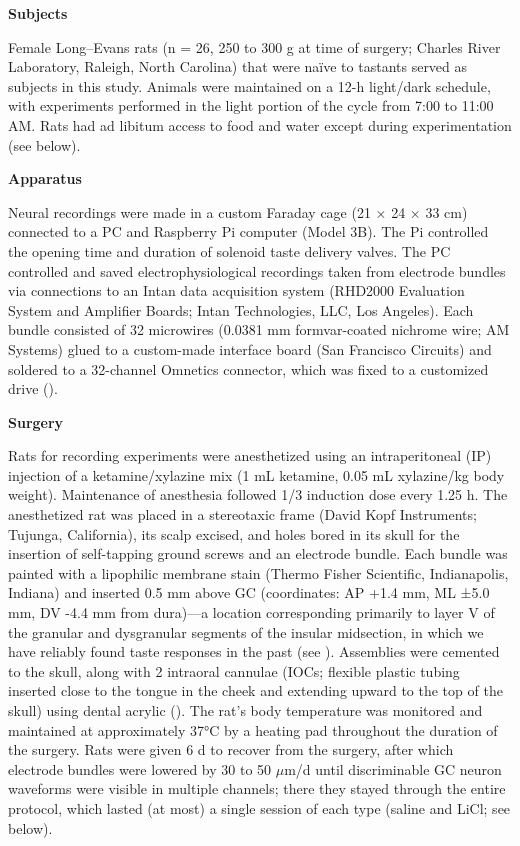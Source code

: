 \begin{refsection}
\smallskip
\noindent\textbf{Subjects}\par
\noindent 
Female Long–Evans rats (n = 26, 250 to 300 g at time of surgery; Charles River Laboratory, Raleigh, North Carolina) that were naïve to tastants served as subjects in this study. Animals were maintained on a 12-h light/dark schedule, with experiments performed in the light portion of the cycle from 7:00 to 11:00 AM. Rats had ad libitum access to food and water except during experimentation (see below).

\smallskip
\noindent\textbf{Apparatus}\par
\noindent 
Neural recordings were made in a custom Faraday cage (21 × 24 × 33 cm) connected to a PC and Raspberry Pi computer (Model 3B). The Pi controlled the opening time and duration of solenoid taste delivery valves. The PC controlled and saved electrophysiological recordings taken from electrode bundles via connections to an Intan data acquisition system (RHD2000 Evaluation System and Amplifier Boards; Intan Technologies, LLC, Los Angeles). Each bundle consisted of 32 microwires (0.0381 mm formvar-coated nichrome wire; AM Systems) glued to a custom-made interface board (San Francisco Circuits) and soldered to a 32-channel Omnetics connector, which was fixed to a customized drive (\cite{mukherjee2017a}).

\smallskip
\noindent\textbf{Surgery}\par
\noindent 
Rats for recording experiments were anesthetized using an intraperitoneal (IP) injection of a ketamine/xylazine mix (1 mL ketamine, 0.05 mL xylazine/kg body weight). Maintenance of anesthesia followed 1/3 induction dose every 1.25 h. The anesthetized rat was placed in a stereotaxic frame (David Kopf Instruments; Tujunga, California), its scalp excised, and holes bored in its skull for the insertion of self-tapping ground screws and an electrode bundle. Each bundle was painted with a lipophilic membrane stain (Thermo Fisher Scientific, Indianapolis, Indiana) and inserted 0.5 mm above GC (coordinates: AP +1.4 mm, ML ±5.0 mm, DV -4.4 mm from dura)—a location corresponding primarily to layer V of the granular and dysgranular segments of the insular midsection, in which we have reliably found taste responses in the past (see \cite{katz-a,katz2001a,sadacca2016a}). Assemblies were cemented to the skull, along with 2 intraoral cannulae (IOCs; flexible plastic tubing inserted close to the tongue in the cheek and extending upward to the top of the skull) using dental acrylic (\cite{fontanini2006a}). The rat’s body temperature was monitored and maintained at approximately 37°C by a heating pad throughout the duration of the surgery. Rats were given 6 d to recover from the surgery, after which electrode bundles were lowered by 30 to 50 \(\mu\)m/d until discriminable GC neuron waveforms were visible in multiple channels; there they stayed through the entire protocol, which lasted (at most) a single session of each type (saline and LiCl; see below).


\end{refsection}
